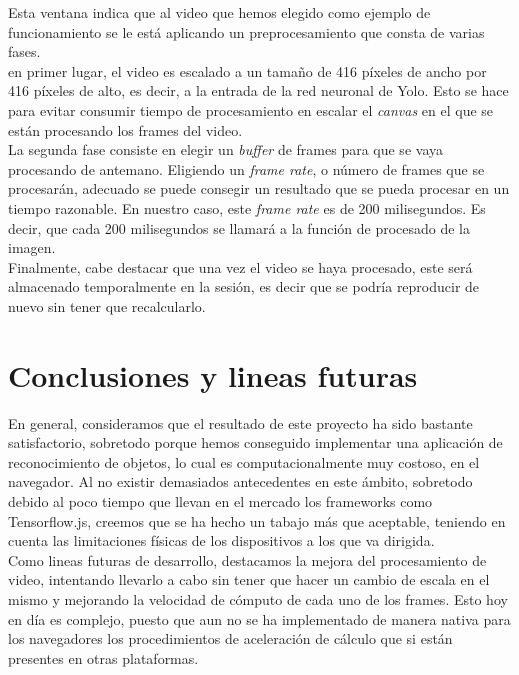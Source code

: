 \documentclass[a4paper]{article}
\begin{document}
Esta ventana indica que al video que hemos elegido como ejemplo de funcionamiento se le está aplicando
un preprocesamiento que consta de varias fases. \\

en primer lugar, el video es escalado a un tamaño de 416 píxeles de ancho por 416 píxeles de alto, es 
decir, a la entrada de la red neuronal de Yolo. Esto se hace para evitar consumir tiempo de 
procesamiento en escalar el \textit{canvas} en el que se están procesando los frames del video. \\

La segunda fase consiste en elegir un \textit{buffer} de frames para que se vaya procesando de 
antemano. Eligiendo un \textit{frame rate}, o número de frames que se procesarán, adecuado se puede
consegir un resultado que se pueda procesar en un tiempo razonable. En nuestro caso, este 
\textit{frame rate} es de 200 milisegundos. Es decir, que cada 200 milisegundos se llamará a la 
función de procesado de la imagen. \\

Finalmente, cabe destacar que una vez el video se haya procesado, este será almacenado temporalmente
en la sesión, es decir que se podría reproducir de nuevo sin tener que recalcularlo.

\section{Conclusiones y lineas futuras}

En general, consideramos que el resultado de este proyecto ha sido bastante satisfactorio, sobretodo
porque hemos conseguido implementar una aplicación de reconocimiento de objetos, lo cual es 
computacionalmente muy costoso, en el navegador. Al no existir demasiados antecedentes en este 
ámbito, sobretodo debido al poco tiempo que llevan en el mercado los frameworks como Tensorflow.js,
creemos que se ha hecho un tabajo más que aceptable, teniendo en cuenta las limitaciones físicas
de los dispositivos a los que va dirigida. \\

Como lineas futuras de desarrollo, destacamos la mejora del procesamiento de video, intentando 
llevarlo a cabo sin tener que hacer un cambio de escala en el mismo y mejorando la velocidad de 
cómputo de cada uno de los frames. Esto hoy en día es complejo, puesto que aun no se ha implementado 
de manera nativa para los navegadores los procedimientos de aceleración de cálculo que si están 
presentes en otras plataformas.
\end{document}
